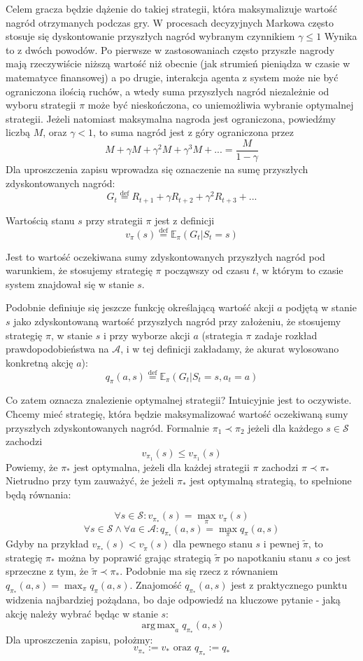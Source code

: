 \documentclass[licencjacka]{pracamgr}
\DeclareMathOperator*{\argmax}{arg\,max}
\begin{document}
Celem gracza będzie dążenie do takiej strategii, która maksymalizuje wartość nagród otrzymanych podczas gry.  W procesach decyzyjnych Markowa często stosuje się dyskontowanie przyszłych nagród wybranym czynnikiem $\gamma\leq1$ Wynika to z dwóch powodów. Po pierwsze w zastosowaniach często przyszłe nagrody mają rzeczywiście niższą wartość niż obecnie (jak strumień pieniądza w czasie w matematyce finansowej) a po drugie, interakcja agenta z system może nie być ograniczona ilością ruchów, a wtedy suma przyszłych nagród niezależnie od wyboru strategii $\pi$ może być nieskończona, co uniemożliwia wybranie optymalnej strategii. Jeżeli natomiast maksymalna nagroda jest ograniczona, powiedźmy liczbą $M$, oraz $\gamma<1$, to suma nagród jest z góry ograniczona przez
$$M+\gamma M +\gamma^{2}M+\gamma^{3}M+...  = \frac{M}{1-\gamma}$$
Dla uproszczenia zapisu wprowadza się oznaczenie na sumę przyszłych zdyskontowanych nagród:
$$G_{t} \stackrel{\text{def}}{=} R_{t+1} + \gamma R_{t+2} + \gamma^{2}R_{t+3} +...$$

Wartością stanu $s$ przy strategii $\pi$ jest z definicji 
$$v_{\pi}(s)\stackrel{\text{def}}{=} \mathbb{E}_{\pi}(G_{t}| S_{t} = s) $$

Jest to wartość oczekiwana sumy zdyskontowanych przyszłych nagród pod warunkiem, że stosujemy strategię $\pi$ począwszy od czasu $t$, w którym to czasie system znajdował się w stanie $s$. 

Podobnie definiuje się jeszcze funkcję określającą wartość akcji $a$ podjętą w stanie $s$ jako zdyskontowaną wartość przyszłych nagród przy założeniu, że stosujemy strategię $\pi$, w stanie $s$ i przy wyborze akcji $a$ (strategia $\pi$ zadaje rozkład prawdopodobieństwa na $\mathcal{A}$, i w tej definicji zakładamy, że akurat wylosowano konkretną akcję $a$):
$$q_{\pi}(a,s) \stackrel{\text{def}}{=} \mathbb{E}_{\pi}(G_{t}| S_{t} = s, a_{t} = a) $$

Co zatem oznacza znalezienie optymalnej strategii? Intuicyjnie jest to oczywiste. Chcemy mieć strategię, która będzie maksymalizować wartość oczekiwaną sumy przyszłych zdyskontowanych nagród. Formalnie $\pi_{1}\prec\pi_{2}$ jeżeli dla każdego $s\in\mathcal{S}$ zachodzi $$v_{\pi_{1}}(s)\leq v_{\pi_{1}}(s)$$
Powiemy, że $\pi_{*}$ jest optymalna, jeżeli dla każdej strategii $\pi$ zachodzi   $\pi\prec\pi_{*}$ Nietrudno przy tym zauważyć, że jeżeli $\pi_{*}$ jest optymalną strategią, to spełnione będą równania:


$$\forall s\in \mathcal{S}: v_{\pi_{*}}(s) =\max_{\pi} v_{\pi}(s)$$ $$\forall s\in\mathcal{S}\wedge \forall a\in\mathcal{A}: q_{\pi_{*}}(a,s) = \max_{\pi} q_{\pi}(a,s)$$
Gdyby na przykład  $v_{\pi_{*}}(s)<v_{\tilde{\pi}}(s)$ dla pewnego stanu $s$ i  pewnej $\tilde{\pi}$, to  strategię $\pi_{*}$ można by poprawić grając strategią $\tilde{\pi}$ po napotkaniu stanu $s$ co jest sprzeczne z tym, że   $\tilde{\pi}\prec\pi_{*}$. Podobnie ma się rzecz z równaniem $q_{\pi_{*}}(a,s) = \max_{\pi} q_{\pi}(a,s)$.  Znajomość $q_{\pi_{*}}(a,s)$ jest z praktycznego punktu widzenia najbardziej pożądana, bo daje odpowiedź na kluczowe pytanie - jaką akcję należy wybrać będąc w stanie $s$:\\
$$\argmax_{a}q_{\pi_{*}}(a,s)$$
Dla uproszczenia zapisu, położmy:
$$v_{\pi_{*}}:=v_{*}\text{ oraz } q_{\pi_{*}}:=q_{*}$$
\end{document}
